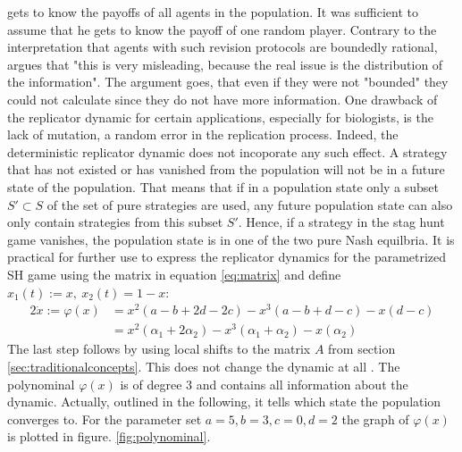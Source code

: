 \documentclass[11pt]{article}
\begin{document}
gets to know the payoffs of all agents in the population.
It was sufficient to assume that he gets to know the payoff of one random 
player. 
Contrary to the interpretation that agents with such revision protocols 
are boundedly rational, \textcite[273]{gintis_game_2000}  argues 
that "this is very misleading, because the real issue is the distribution of 
the information". The argument goes, that even if they were not "bounded" they 
could not calculate since they do not have more information. 
One drawback of the replicator dynamic for certain applications, especially
for biologists, is the lack of mutation, a random error in the replication 
process. Indeed, the deterministic replicator dynamic does not incoporate 
any such effect. A strategy that has not existed or has vanished from the 
population will not be in a future state of the population. 
That means that if in a population state only a subset $S' \subset S$ of the 
set of pure strategies are used, any future population state can also only 
contain strategies from this subset $S'$. Hence, if a strategy in 
the stag hunt game vanishes, the population state is in one of the two pure 
Nash equilbria. It is practical for further use to express the replicator 
dynamics for the parametrized SH game using the matrix in equation 
\eqref{eq:matrix} and define $x_1(t) := x,\ x_2(t) = 1-x$:
\begin{alignat}{2}
        \label{eq:replicatorpara}
        \dot{x} := \varphi(x) &= x^2(a-b+2d-2c) - x^3(a-b+d-c) -x(d-c) \\
                              &= x^2(\alpha_1+2\alpha_2) 
        - x^3(\alpha_1+\alpha_2) - x(\alpha_2)
\end{alignat}
The last step follows by using local shifts to the matrix $A$ from section
\ref{sec:traditionalconcepts}. This does not change the dynamic at all 
\parencite[73]{weibull_evolutionary_1997}. The polynominal $\varphi(x)$ is
of degree $3$ and contains all information about the dynamic. Actually, 
outlined in the following, it tells which state the population converges to.
For the parameter set $a=5, b=3, c=0, d=2$ the graph of $\varphi(x)$ is 
plotted in figure.  
\ref{fig:polynominal}.
\end{document}
